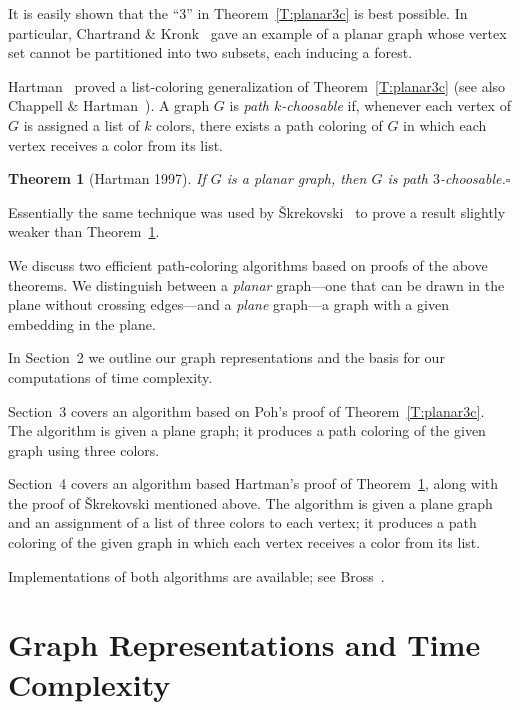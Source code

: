 \documentclass[12pt,letterpaper]{article}
\theoremstyle{plain}
\newtheorem{theorem}[lemma]{Theorem}         %
\theoremstyle{definition}
\theoremstyle{break}
\newcommand{\ggcqedsymbol}{$\square$}
\newcommand{\ggcqed}{\hbox{}\nobreak\hbox{\quad\ggcqedsymbol}}
\newcommand{\ggcnopf}{\ggcqed}
\newcommand{\defterm}[1]{\emph{#1}} %
\begin{document}
It is easily shown that the ``$3$'' in Theorem~\ref{T:planar3c}
is best possible.
In particular, Chartrand \& Kronk~\cite[Section~3]{ChKr1969}
gave an example of a planar graph whose vertex set cannot be partitioned
into two subsets, each inducing a forest.

Hartman~\cite[Thm.~4.1]{Har1997}
proved a list-coloring generalization of Theorem~\ref{T:planar3c}
(see also Chappell \& Hartman~\cite[Thm.~2.1]{ChHa2017prep}).
A graph $G$ is \defterm{path $k$-choosable} if,
whenever each vertex of $G$ is assigned a list of $k$ colors,
there exists a path coloring of $G$ in which each vertex receives
a color from its list.

\begin{theorem}[Hartman 1997] \label{T:planar3}
If $G$ is a planar graph,
then $G$ is path $3$-choosable.\ggcnopf\end{theorem}

Essentially the same technique was used by
\v{S}krekovski~\cite[Thm.~2.2b]{Skr1999}
to prove a result slightly weaker than Theorem~\ref{T:planar3}.


\medskip

We discuss two efficient path-coloring algorithms
based on proofs of the above theorems.
We distinguish between a \defterm{planar} graph---one that
can be drawn in the plane without crossing edges---and
a \defterm{plane} graph---a graph with a given embedding
in the plane.

In Section~2 we outline our graph representations
and the basis for our computations of time complexity.

Section~3 covers an algorithm
based on Poh's proof of Theorem~\ref{T:planar3c}.
The algorithm is given a plane graph;
it produces a path coloring of the given graph
using three colors.

Section~4 covers an algorithm
based Hartman's proof of Theorem~\ref{T:planar3},
along with the proof of \v{S}krekovski mentioned above.
The algorithm is given a plane graph
and an assignment of a list of three colors to each vertex;
it produces a path coloring of the given graph
in which each vertex receives a color from its list.

Implementations of both algorithms are available;
see Bross~\cite{Bro2017}.


\section{Graph Representations and Time Complexity}
\end{document}
